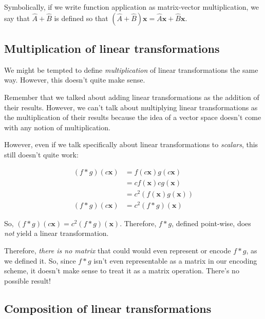 \documentclass[]{article}
\begin{document}
Symbolically, if we write function application as matrix-vector multiplication,
we say that \(\hat{A} + \hat{B}\) is defined so that
\((\hat{A} + \hat{B})\mathbf{x} = \hat{A} \mathbf{x} + \hat{B} \mathbf{x}\).

\hypertarget{multiplication-of-linear-transformations}{%
\subsection{Multiplication of linear
transformations}\label{multiplication-of-linear-transformations}}

We might be tempted to define \emph{multiplication} of linear transformations
the same way. However, this doesn't quite make sense.

Remember that we talked about adding linear transformations as the addition of
their results. However, we can't talk about multiplying linear transformations
as the multiplication of their results because the idea of a vector space
doesn't come with any notion of multiplication.

However, even if we talk specifically about linear transformations to
\emph{scalars}, this still doesn't quite work:

\[
\begin{aligned}
(f * g)(c \mathbf{x}) & = f(c \mathbf{x}) g(c \mathbf{x}) \\
                      & = c f(\mathbf{x}) c g(\mathbf{x}) \\
                      & = c^2 ( f(\mathbf{x}) g(\mathbf{x}) ) \\
(f * g)(c \mathbf{x}) & = c^2 (f * g)(\mathbf{x})
\end{aligned}
\]

So, \((f * g)(c \mathbf{x}) = c^2 (f * g)(\mathbf{x})\). Therefore, \(f * g\),
defined point-wise, does \emph{not} yield a linear transformation.

Therefore, \emph{there is no matrix} that could would even represent or encode
\(f * g\), as we defined it. So, since \(f * g\) isn't even representable as a
matrix in our encoding scheme, it doesn't make sense to treat it as a matrix
operation. There's no possible result!

\hypertarget{composition-of-linear-transformations}{%
\subsection{Composition of linear
transformations}\label{composition-of-linear-transformations}}
\end{document}

